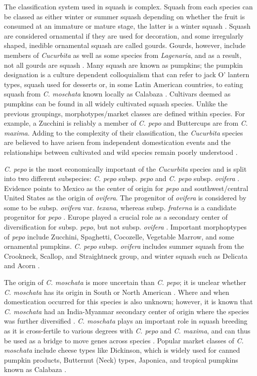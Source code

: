 \documentclass[utf8]{FrontiersinHarvard} %
\begin{document}
The classification system used in squash is complex.
Squash from each species can be classed as either winter or summer squash depending on whether the fruit is consumed at an immature or mature stage, the latter is a winter squash \citep{Loy2004}.
Squash are considered ornamental if they are used for decoration, and some irregularly shaped, inedible ornamental squash are called gourds. Gourds, however, include members of \emph{Cucurbita} as well as some species from \emph{Lagenaria}, and as a result, not all gourds are squash \citep{Paris2015}.
Many squash are known as pumpkins; the pumpkin designation is a culture dependent colloquialism that can refer to jack O' lantern types, squash used for desserts or, in some Latin American countries, to eating squash from \emph{C. moschata} known locally as Calabaza \citep{Ferriol}.
Cultivars deemed as pumpkins can be found in all widely cultivated squash species.
Unlike the previous groupings, morphotypes/market classes are defined within species.
For example, a Zucchini is reliably a member of \emph{C. pepo} and Buttercups are from \emph{C. maxima}.
Adding to the complexity of their classification, the \emph{Cucurbita} species are believed to have arisen from independent domestication events and the relationships between cultivated and wild species remain poorly understood \citep{Kates2017}.

\emph{C. pepo} is the most economically important of the \emph{Cucurbita} species and is split into two different subspecies: \emph{C. pepo} subsp. \emph{pepo} and \emph{C. pepo} subsp. \emph{ovifera} \citep{Xanthopoulou2019}.
Evidence points to Mexico as the center of origin for \emph{pepo} and southwest/central United States as the origin of \emph{ovifera}. The progenitor of \emph{ovifera} is considered by some to be subsp. \emph{ovifera} var. \emph{texana}, whereas subsp. \emph{fraterna} is a candidate progenitor for \emph{pepo} \citep{Kates2017}.
Europe played a crucial role as a secondary center of diversification for subsp. \emph{pepo}, but not subsp. \textit{ovifera} \citep{Lust2016}.
Important morphoptypes of \emph{pepo} include Zucchini, Spaghetti, Cocozelle, Vegetable Marrow, and some ornamental pumpkins.
\emph{C. pepo} subsp. \emph{ovifera} includes summer squash from the Crookneck, Scallop, and Straightneck group, and winter squash such as Delicata and Acorn \citep{Paris2012}.

The origin of \emph{C. moschata} is more uncertain than \emph{C. pepo}; it is unclear whether \emph{C. moschata} has its origin in South or North American \citep{Chomicki2020}.
Where and when domestication occurred for this species is also unknown; however, it is known that \emph{C. moschata} had an India-Myanmar secondary center of origin where the species was further diversified \citep{Sun2017}.
\emph{C. moschata} plays an important role in squash breeding as it is cross-fertile to various degrees with \emph{C. pepo} and \emph{C. maxima}, and can thus be used as a bridge to move genes across species \citep{Sun2017}.
Popular market classes of \emph{C. moschata} include cheese types like Dickinson, which is widely used for canned pumpkin products, Butternut (Neck) types, Japonica, and tropical pumpkins known as Calabaza \citep{Ferriol}.
\end{document}
